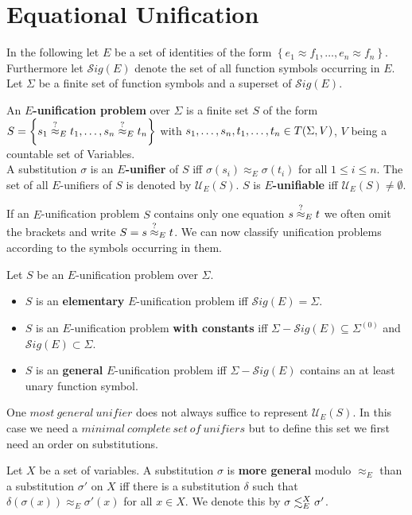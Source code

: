 \section{Equational Unification}
In the following let $E$ be a set of identities of the form $\left\lbrace  e_1\approx f_1,\dots,e_n\approx f_n \right\rbrace$. Furthermore let $\mathcal{S}ig(E)$ denote the set of all function symbols occurring in $E$. Let $\Sigma$ be a finite set of function symbols and a superset of $\mathcal{S}ig(E)$.
\begin{definition}
	An \textbf{$E$-unification problem} over $\Sigma$ is a finite set $S$ of the form $S=\left\lbrace s_1\stackrel{?}{\approx}_{E} t_1,\dots,s_n\stackrel{?}{\approx}_{E} t_n\right\rbrace $ with $s_1,\dots,s_n,t_1,\dots,t_n \in T(\Sigma,V)$, $V$ being a countable set of Variables.\\
	A substitution $\sigma$ is an \textbf{$E$-unifier} of $S$ iff $ \sigma(s_i)\approx_E \sigma(t_i)$ for all $1\leq i \leq n$.
	The set of all $E$-unifiers of $S$ is denoted by $\mathcal{U}_E(S)$. $S$ is \textbf{$E$-unifiable} iff $\mathcal{U}_E(S)\neq \emptyset$.
\end{definition}
If an $E$-unification problem $S$ contains only one equation $s\stackrel{?}{\approx}_E t$ we often omit the brackets and write $S=s\stackrel{?}{\approx}_E t$. We can now classify unification problems according to the symbols occurring in them.
\begin{definition}
	Let $S$ be an $E$-unification problem over $\Sigma$.
	\begin{itemize}
		\item $S$ is an \textbf{elementary} $E$-unification problem iff $\mathcal{S}ig(E)=\Sigma$.
		\item $S$ is an $E$-unification problem \textbf{with constants} iff $\Sigma-\mathcal{S}ig(E)\subseteq\Sigma^{(0)}$ and $\mathcal{S}ig(E)\subset\Sigma$.
		\item $S$ is an \textbf{general} $E$-unification problem iff $\Sigma-\mathcal{S}ig(E)$ contains an at least unary function symbol.
	\end{itemize}
\end{definition}
One $most\ general\ unifier$ does not always suffice to represent $\mathcal{U}_E(S)$. In this case we need a $minimal\ complete\ set\ of\ unifiers$ but to define this set we first need an order on substitutions.
\begin{definition}
	Let $X$ be a set of variables. A substitution $\sigma$ is \textbf{more general} modulo $\approx_E$ than a substitution $\sigma'$ on $X$ iff there is a substitution $\delta$ such that $\delta(\sigma(x))\approx_E\sigma'(x)$ for all $x \in X$. We denote this by $\sigma\lesssim^X_E\sigma'$.
\end{definition}
